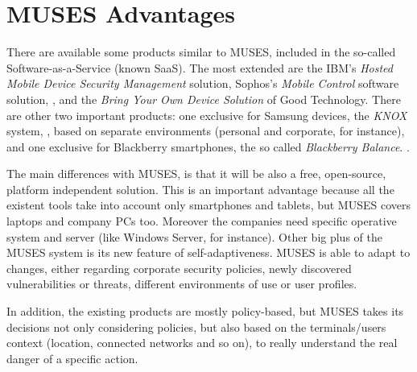 \documentclass{sig-alternate}
\begin{document}


%
%
\section{MUSES Advantages}
\label{sec:advantages}


There are available some products similar to MUSES, included in the so-called Software-as-a-Service (known SaaS). The most extended are the IBM's \textit{Hosted Mobile Device Security Management} solution, %
Sophos's \textit{Mobile Control} software solution, 
\cite{Sophos_tool}, 
and the \textit{Bring Your Own Device Solution}
\cite{Good_tool} 
of Good Technology. There are other two important products: one exclusive for Samsung devices, the \textit{KNOX} system,
\cite{Samsung_tool}, 
based on separate environments (personal and corporate, for instance), and one exclusive for Blackberry smartphones, the so called \textit{Blackberry Balance}.
\cite{Blackberry_tool}. 

The main differences with MUSES, is that it will be also a free, open-source, platform independent solution. This is an important advantage because all the existent tools take into account only smartphones and tablets, but MUSES covers laptops and company PCs too. Moreover the companies need specific operative system and server (like Windows Server, for instance). Other big plus of the MUSES system is its new feature of self-adaptiveness. MUSES is able to adapt to changes, either regarding corporate security policies, newly discovered vulnerabilities or threats, different environments of use or user profiles. 

In addition, the existing products are mostly policy-based, but MUSES takes its decisions not only considering policies, but also based on the terminals/users context (location, connected networks and so on), to really understand the real danger of a specific action.
\end{document}
